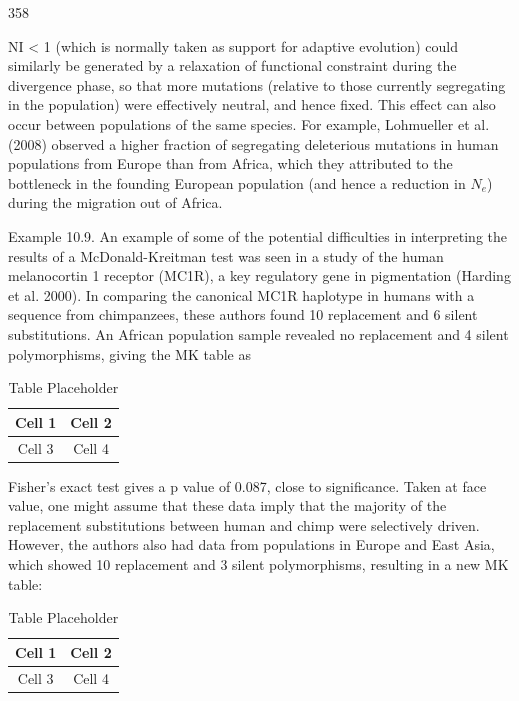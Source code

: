 \documentclass{article}
\begin{document}
358

NI < 1 (which is normally taken as support for adaptive evolution) could similarly be generated by a relaxation of functional constraint during the divergence phase, so that more mutations (relative to those currently segregating in the population) were effectively neutral, and hence fixed. This effect can also occur between populations of the same species. For example, Lohmueller et al. (2008) observed a higher fraction of segregating deleterious mutations in human populations from Europe than from Africa, which they attributed to the bottleneck in the founding European population (and hence a reduction in  $ N_{e} $) during the migration out of Africa.

Example 10.9. An example of some of the potential difficulties in interpreting the results of a McDonald-Kreitman test was seen in a study of the human melanocortin 1 receptor (MC1R), a key regulatory gene in pigmentation (Harding et al. 2000). In comparing the canonical MC1R haplotype in humans with a sequence from chimpanzees, these authors found 10 replacement and 6 silent substitutions. An African population sample revealed no replacement and 4 silent polymorphisms, giving the MK table as

\begin{table}[h]
\centering
\begin{tabular}{|c|c|}
\hline
Cell 1 & Cell 2 \\
\hline
Cell 3 & Cell 4 \\
\hline
\end{tabular}
\caption{Table Placeholder}
\end{table}

Fisher's exact test gives a p value of 0.087, close to significance. Taken at face value, one might assume that these data imply that the majority of the replacement substitutions between human and chimp were selectively driven. However, the authors also had data from populations in Europe and East Asia, which showed 10 replacement and 3 silent polymorphisms, resulting in a new MK table:

\begin{table}[h]
\centering
\begin{tabular}{|c|c|}
\hline
Cell 1 & Cell 2 \\
\hline
Cell 3 & Cell 4 \\
\hline
\end{tabular}
\caption{Table Placeholder}
\end{table}
\end{document}
